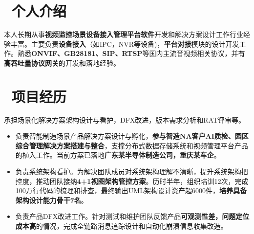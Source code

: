 \documentclass{resume}
\begin{document}



\section{\faFileText\ 个人介绍}
    本人长期从事\textbf{视频监控场景设备接入管理平台软件}开发和解决方案设计工作行业经验丰富。主要负责\textbf{设备接入}（如IPC，NVR等设备)，\textbf{平台对接}模块的设计开发工作。熟悉\textbf{ONVIF、GB28181、SIP、RTSP}等国内主流音视频相关协议，并有\textbf{高吞吐量协议网关}的开发和落地经验。

\section{\faBriefcase\ 项目经历}

\begin{onehalfspacing}
承担场景化解决方案架构设计与看护，DFX改进，版本需求分析和RAT评审等。
\begin{itemize}
  \item 负责智能制造场景产品解决方案设计与孵化，\textbf{参与智造NA客户AI质检、园区综合管理解决方案搭建与整合}，支撑分布式数据存储系统和视频管理平台产品的植入工作。当前方案已落地\textbf{广东某半导体制造公司，重庆某车企}。
  \item 负责系统架构看护。为解决团队成员对系统架构理解不清晰，提升系统架构把控度，推动团队接纳\textbf{4+1视图架构管控方案}。历时半年，组织培训12次，完成100万行代码的梳理和排查，最终输出UML架构设计资产超6000件，\textbf{培养具备架构设计能力骨干7名}。
  \item 负责产品DFX改进工作。针对测试和维护团队反馈产品\textbf{可观测性差，问题定位成本高}的情况，完成全链路消息追踪设计和自动化崩溃信息收集改造。
\end{itemize}
\end{onehalfspacing}
\end{document}
